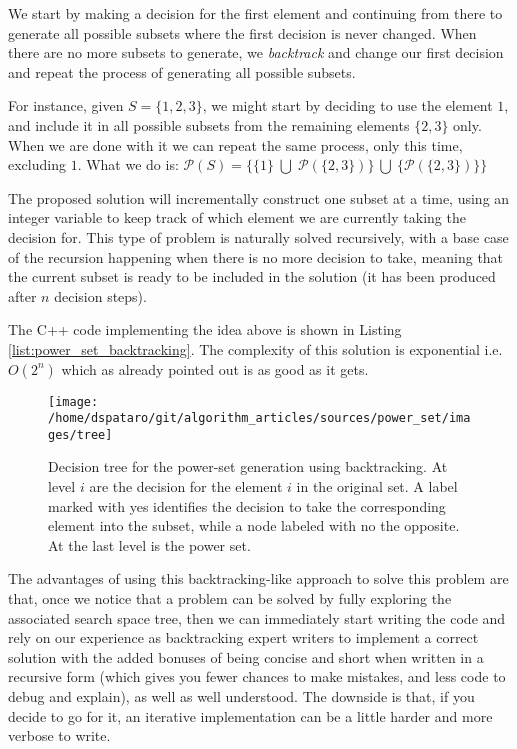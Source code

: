 We start by making a decision for the first element and continuing from there to generate all possible subsets
where the first decision is never changed. 
When there are no more subsets to generate, we \textit{backtrack} and change our first
decision and repeat the process of generating all possible subsets.

For instance, given $S=\{1,2,3\}$, we might start by deciding to use the element $1$, and include it in all possible subsets from the remaining elements $\{2, 3\}$ only. 
When we are done with it we can repeat the same process, only this time, excluding $1$. What we do is: $\mathcal{P}(S)= \{\{1\} \; \bigcup \;\mathcal{P}(\{2,3\})\} \: \bigcup \: \{\mathcal{P}(\{2,3\})\}\} 
$

The proposed solution will incrementally construct one subset at a time, 
using an integer variable to keep track of which element we are currently taking the decision for.
This type of problem is naturally solved recursively, with a base case of the recursion happening when there is no more decision
to take, meaning that the current subset is ready to be included in the solution (it has been
produced after $n$ decision steps).

The C++ code implementing the idea above is shown in Listing \ref{list:power_set_backtracking}. The complexity of this solution is exponential i.e. $O(2^n)$ which as already pointed out is as good as
it gets.





\begin{figure}
    \centering
    \texttt{[image: /home/dspataro/git/algorithm\_articles/sources/power\_set/images/tree]}
    \caption[Decision tree for the power-set generation using backtracking.]{Decision tree for the power-set generation using backtracking. At level $i$ are the decision for the element $i$ in the original set. A label marked with yes identifies the decision to take the corresponding element into the subset, while a node labeled with no the opposite. At the last level is the power set.}
    \label{ref:power_set_decision_trees}
\end{figure}

The advantages of using this backtracking-like approach to solve this problem are that, once we notice
that a problem can be solved by fully exploring the associated search space tree, then we can immediately
start writing the code and rely on our experience as backtracking expert writers to implement a correct
solution with the added bonuses of being concise and short when written in a recursive  form (which gives you fewer chances to make mistakes, and less code to debug and explain),  as well
as well understood.
The downside is that, if you decide to go for it, an iterative implementation can be a little harder and more verbose to write.

